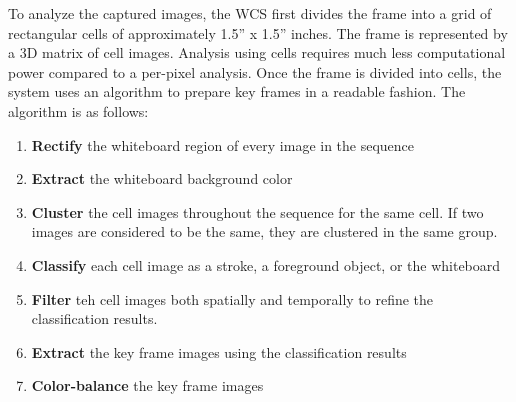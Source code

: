 \documentclass{article}
\begin{document}
To analyze the captured images, the WCS first divides the frame into a grid of rectangular cells of approximately 1.5'' x 1.5'' inches.  The frame is represented by a 3D matrix of cell images.  Analysis using cells requires much less computational power compared to a per-pixel analysis.  Once the frame is divided into cells, the system uses an algorithm to prepare key frames in a readable fashion.  The algorithm is as follows:

\begin{enumerate} \itemsep -2pt
\item \textbf{Rectify} the whiteboard region of every image in the sequence
\item \textbf{Extract} the whiteboard background color
\item \textbf{Cluster} the cell images throughout the sequence for the same cell. If two images are considered to be the same, they are clustered in the same group.
\item \textbf{Classify} each cell image as a stroke, a foreground object, or the whiteboard
\item \textbf{Filter} teh cell images both spatially and temporally to refine the classification results.
\item \textbf{Extract} the key frame images using the classification results
\item \textbf{Color-balance} the key frame images
\end{enumerate}
\end{document}
